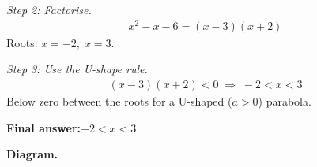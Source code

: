 \documentclass[11pt]{article}
\begin{document}
\textit{Step 2: Factorise.}
\[\begin{gathered}
x^2 - x - 6 = (x - 3)(x + 2)
\end{gathered}\]
Roots: \( x = -2, \; x = 3 \).

\textit{Step 3: Use the U-shape rule.}
\[\begin{gathered}
(x - 3)(x + 2) < 0 \;\Longrightarrow\; -2 < x < 3
\end{gathered}\]
Below zero between the roots for a U-shaped (\( a > 0 \)) parabola.

\begin{answerbox}
\textbf{Final answer:}\quad \(\displaystyle -2 < x < 3\)
\end{answerbox}
\textbf{Diagram.}

\begin{center}
\end{center}
\end{document}
